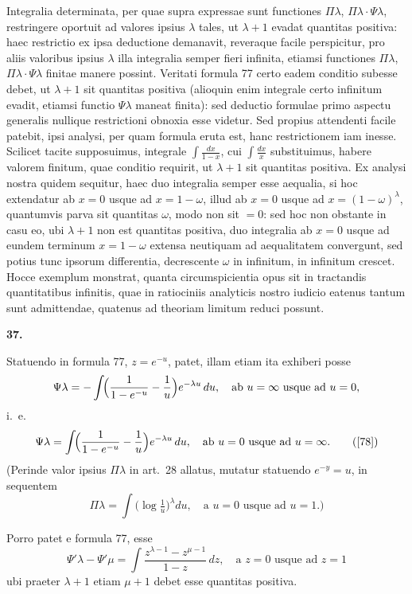 \documentclass[12pt,a4paper]{article}
\newcommand{\art}[1]{\par\medskip\noindent\textbf{#1.}\par\nopagebreak\smallskip}
\begin{document}
Integralia determinata, per quae supra expressae sunt functiones $\Pi\lambda$, $\Pi\lambda\cdot\Psi\lambda$, restringere oportuit ad valores ipsius $\lambda$ tales, ut $\lambda+1$ evadat quantitas positiva: haec restrictio ex ipsa deductione demanavit, reveraque facile perspicitur, pro aliis valoribus ipsius $\lambda$ illa integralia semper fieri infinita, etiamsi functiones $\Pi\lambda$, $\Pi\lambda\cdot\Psi\lambda$ finitae manere possint. Veritati formula 77 certo eadem conditio subesse debet, ut $\lambda+1$ sit quantitas positiva (alioquin enim integrale certo infinitum evadit, etiamsi functio $\Psi\lambda$ maneat finita): sed deductio formulae primo aspectu generalis nullique restrictioni obnoxia esse videtur. Sed propius attendenti facile patebit, ipsi analysi, per quam formula eruta est, hanc restrictionem iam inesse. Scilicet tacite supposuimus, integrale $\int\!\frac{dx}{1-x}$, cui $\int\!\frac{dx}{x}$ substituimus, habere valorem finitum, quae conditio requirit, ut $\lambda+1$ sit quantitas positiva. Ex analysi nostra quidem sequitur, haec duo integralia semper esse aequalia, si hoc extendatur ab $x=0$ usque ad $x=1-\omega$, illud ab $x=0$ usque ad $x=(1-\omega)^\lambda$, quantumvis parva sit quantitas $\omega$, modo non sit $=0$: sed hoc non obstante in casu eo, ubi $\lambda+1$ non est quantitas positiva, duo integralia ab $x=0$ usque ad eundem terminum $x=1-\omega$ extensa neutiquam ad aequalitatem convergunt, sed potius tunc ipsorum differentia, decrescente $\omega$ in infinitum, in infinitum crescet. Hocce exemplum monstrat, quanta circumspicientia opus sit in tractandis quantitatibus infinitis, quae in ratiociniis analyticis nostro iudicio eatenus tantum sunt admittendae, quatenus ad theoriam limitum reduci possunt.

\art{37}

Statuendo in formula 77, $z=e^{-u}$, patet, illam etiam ita exhiberi posse
\[
\Psi\lambda = -\int\!\Bigl(\frac{1}{1-e^{-u}} - \frac{1}{u}\Bigr)e^{-\lambda u}\,du,\quad \text{ab }u=\infty\text{ usque ad }u=0,
\]
i.\ e.
\begin{equation}
\Psi\lambda = \int\!\Bigl(\frac{1}{1-e^{-u}} - \frac{1}{u}\Bigr)e^{-\lambda u}\,du,\quad \text{ab }u=0\text{ usque ad }u=\infty.\tag{[78]}
\end{equation}
(Perinde valor ipsius $\Pi\lambda$ in art.\ 28 allatus, mutatur statuendo $e^{-y}=u$, in sequentem
\[
\Pi\lambda = \int\!\bigl(\log\tfrac{1}{u}\bigr)^\lambda du,\quad \text{a }u=0\text{ usque ad }u=1.)
\]

Porro patet e formula 77, esse
\begin{equation}
\Psi'\lambda - \Psi'\mu = \int\!\frac{z^{\lambda-1}-z^{\mu-1}}{1-z}\,dz,\quad \text{a }z=0\text{ usque ad }z=1\tag{[79]}
\end{equation}
ubi praeter $\lambda+1$ etiam $\mu+1$ debet esse quantitas positiva.
\end{document}
